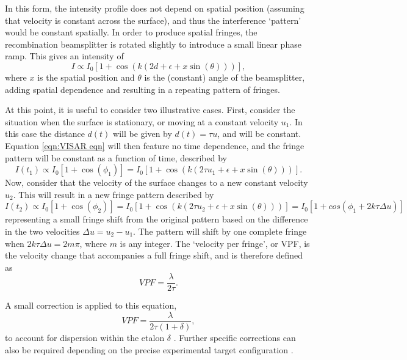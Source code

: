 In this form, the intensity profile does not depend on spatial position (assuming that velocity is constant across the surface), and thus the interference `pattern' would be constant spatially. In order to produce spatial fringes, the recombination beamsplitter is rotated slightly to introduce a small linear phase ramp. This gives an intensity of \begin{equation} \label{eqn:VISAR eqn}I \propto  I_0 [1 + \cos(k (2d + \epsilon + x\sin(\theta) ))],\end{equation} where $x$ is the spatial position and $\theta$ is the (constant) angle of the beamsplitter, adding spatial dependence and resulting in a repeating pattern of fringes.

At this point, it is useful to consider two illustrative cases. First, consider the situation when the surface is stationary, or moving at a constant velocity $u_1$. In this case the distance $d(t)$ will be given by $d(t) = \tau u$, and will be constant. Equation \ref{eqn:VISAR eqn} will then feature no time dependence, and the fringe pattern will be constant as a function of time, described by 
\begin{equation} I(t_1) \propto I_0 [1 + \cos(\phi_1)] =  I_0 [1 + \cos(k (2\tau u_1 + \epsilon + x\sin(\theta)))].\end{equation}
Now, consider that the velocity of the surface changes to a new constant velocity $u_2$. This will result in a new fringe pattern described by \begin{equation}I(t_2) \propto I_0 [1 + \cos(\phi_2)] =  I_0 [1 + \cos(k (2\tau u_2 + \epsilon + x\sin(\theta)))] = I_0 [1 + cos(\phi_1 + 2k\tau \Delta u)] \end{equation}
representing a small fringe shift from the original pattern based on the difference in the two velocities $\Delta u = u_2 - u_1$. The pattern will shift by one complete fringe when $2k\tau \Delta u = 2 m \pi$, where $m$ is any integer. The `velocity per fringe', or VPF, is the velocity change that accompanies a full fringe shift, and is therefore defined as \begin{equation} VPF = \frac{\lambda}{2\tau}. \end{equation}

A small correction is applied to this equation, \begin{equation} VPF = \frac{\lambda}{2\tau (1 + \delta)}, \end{equation} to account for dispersion within the etalon $\delta$ \cite{Barker1974}. Further specific corrections can also be required depending on the precise experimental target configuration \cite{Barker1970, Celliers2004}.

